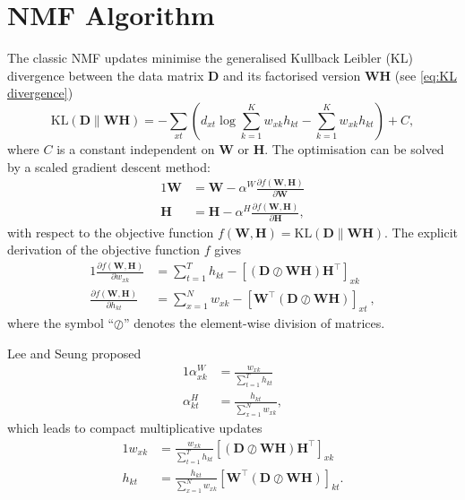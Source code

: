 \chapter{NMF Algorithm\label{app:NMF-algorithm}}

The classic NMF updates \cite{Lee2001} minimise the generalised Kullback \textendash{} Leibler (KL) divergence between the data matrix $\bm{D}$ and its factorised version $\bm{WH}$ (see \autoref{eq:KL divergence})
%
\begin{equation}
	\mbox{KL}(\bm{D}\parallel\bm{WH})=-\sum_{xt}\left(d_{xt}\log\sum_{k=1}^Kw_{xk}h_{kt}-\sum_{k=1}^Kw_{xk}h_{kt}\right)+C,
	\label{app-eq:KL}
\end{equation}
where $C$ is a constant independent on $\bm{W}$ or $\bm{H}$. The optimisation can be solved by a scaled gradient descent method:
%
\begin{alignat}{1}
	\bm{W} & =\bm{W}-\alpha^{W}\frac{\partial f(\bm{W,H})}{\partial \bm{W}}\nonumber \\
	\bm{H} & =\bm{H}-\alpha^{H}\frac{\partial f(\bm{W,H})}{\partial \bm{H}},
	\label{eq:gradient descend}
\end{alignat}
%
with respect to the objective function $f(\bm{W,H})=\mbox{KL}(\bm{D}\parallel\bm{WH})$. The explicit derivation of the objective function $f$ gives
%
\begin{alignat}{1}
	\frac{\partial f(\bm{W,H})}{\partial w_{xk}} & =\sum_{t=1}^T h_{kt}-\left[(\bm{D}\oslash\bm{WH})\bm{H}^{\top}\right]_{xk}\nonumber \\
	\frac{\partial f(\bm{W,H})}{\partial h_{kt}} & =\sum_{x=1}^N w_{xk}-\left[\bm{W^{\top}}(\bm{D}\oslash\bm{WH})\right]_{xt}\ ,
	\label{eq:gradients}
\end{alignat}
%
where the symbol ``$\oslash$'' denotes the element-wise division of matrices. 

Lee and Seung \cite{Lee2001} proposed 
%
\begin{alignat}{1}
	\alpha_{xk}^{W} & =\frac{w_{xk}}{\sum_{t=1}^Th_{kt}}\nonumber \\
	\alpha_{kt}^{H} & =\frac{h_{kt}}{\sum_{x=1}^Nw_{xk}},
	\label{eq:alphas}
\end{alignat}
%
which leads to compact multiplicative updates
%
\begin{alignat}{1}
	w_{xk} & =\frac{w_{xk}}{\sum_{t=1}^Th_{kt}}\left[(\bm{D}\oslash\bm{WH})\bm{H^{\top}}\right]_{xk}\nonumber \\
	h_{kt} & =\frac{h_{kt}}{\sum_{x=1}^Nw_{xk}}\left[\bm{W^{\top}}(\bm{D}\oslash\bm{WH})\right]_{kt}.
	\label{eq:classic updates}
\end{alignat}
%


